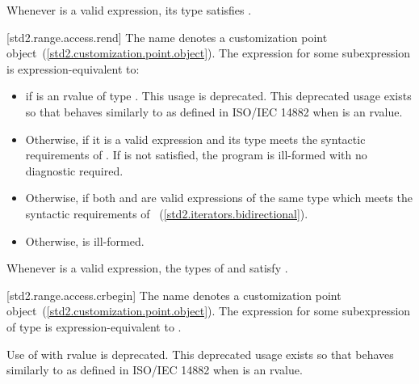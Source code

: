 \pnum
\enternote Whenever  is a valid expression, its
type satisfies . \exitnote

[std2.range.access.rend]{}
\pnum
The name  denotes a customization point
object~(\ref{std2.customization.point.object}). The expression
 for some subexpression  is expression-equivalent to:

\begin{itemize}
\item
   if  is an rvalue of
  type . This usage is deprecated.
  \enternote This deprecated usage exists so that
   behaves similarly to 
  as defined in ISO/IEC 14882 when  is an rvalue. \exitnote

\item
  Otherwise,  if it is a valid expression and its type  meets the
  syntactic requirements of
  . If
   is not satisfied, the program is ill-formed with
  no diagnostic required.

\item
  Otherwise,  if both
   and  are valid expressions of the same
  type  which meets the syntactic requirements of
  ~(\ref{std2.iterators.bidirectional}).

\item
  Otherwise,  is ill-formed.
\end{itemize}

\pnum
\enternote Whenever  is a valid expression, the
types of  and  satisfy
. \exitnote

[std2.range.access.crbegin]{}
\pnum
The name  denotes a customization point
object~(\ref{std2.customization.point.object}). The expression
 for some subexpression  of type 
is expression-equivalent to .

\pnum
Use of  with rvalue  is deprecated.
\enternote This deprecated usage exists so that 
behaves similarly to  as defined in ISO/IEC 14882 when
 is an rvalue. \exitnote

